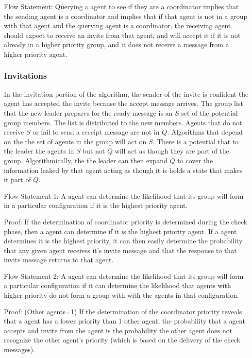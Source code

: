 Flow Statement: Querying a agent to see if they are a coordinator implies that the sending agent is a coordinator and implies that if that agent is not in a group with that agent and the querying agent is a coordinator, the receiving agent should expect to receive an invite from that agent, and will accept it if it is not already in a higher priority group, and it does not receive a message from a higher priority agent.

\subsubsection{Invitations}

In the invitation portion of the algorithm, the sender of the invite is confident the agent has accepted the invite because the accept message arrives. The group list that the new leader prepares for the ready message is an $S$ set of the potential group members. The list is distributed to the new members. Agents that do not receive $S$ or fail to send a receipt message are not in $Q$. Algorithms that depend on the the set of agents in the group will act on $S$. There is a potential that to the leader the agents in $S$ but not $Q$ will act as though they are part of the group. Algorithmically, the the leader can then expand $Q$ to cover the information leaked by that agent acting as though it is holds a state that makes it part of $Q$.

Flow Statement 1: A agent can determine the likelihood that its group will form in a particular configuration if it is the highest priority agent.

Proof: If the determination of coordinator priority is determined during the check phase, then a agent can determine if it is the highest priority agent. If a agent determines it is the highest priority, it can then easily determine the probability that any given agent receives it's invite message and that the response to that invite message returns to that agent.

Flow Statement 2: A agent can determine the likelihood that its group will form a particular configuration if it can determine the likelihood that agents with higher priority do not form a group with with the agents in that configuration.

Proof:  (Other agents=1) If the determination of the coordinator priority reveals that a agent has a lower priority than 1 other agent, the probability that a agent accepts and invite from the agent is the probability the other agent does not recognize the other agent's priority (which is based on the delivery of the check messages).

